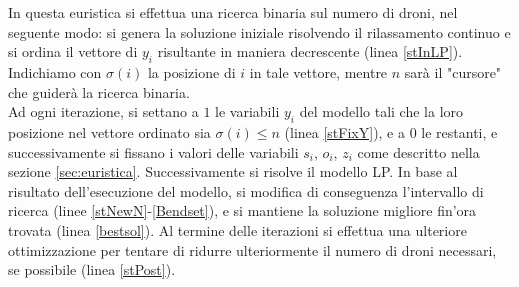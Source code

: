 In questa euristica si effettua una ricerca binaria sul numero di droni, nel seguente modo: si genera la soluzione iniziale risolvendo il rilassamento continuo e si ordina il vettore di $y_i$ risultante in maniera decrescente (linea \ref{stInLP}). Indichiamo con $\sigma(i)$ la posizione di $i$ in tale vettore, mentre $n$ sarà il "cursore" che guiderà la ricerca binaria. \\
Ad ogni iterazione, si settano a $1$ le variabili $y_i$ del modello tali che la loro posizione nel vettore ordinato sia $\sigma(i) \leq n$ (linea \ref{stFixY}), e a $0$ le restanti, e successivamente si fissano i valori delle variabili $s_i$, $o_i$, $z_i$ come descritto nella sezione \ref{sec:euristica}. Successivamente si risolve il modello LP.
In base al risultato dell'esecuzione del modello, si modifica di conseguenza l'intervallo di ricerca (linee \ref{stNewN}-\ref{Bendset}), e si mantiene la soluzione migliore fin'ora trovata (linea \ref{bestsol}).
Al termine delle iterazioni si effettua una ulteriore ottimizzazione per tentare di ridurre ulteriormente il numero di droni necessari, se possibile (linea \ref{stPost}).
